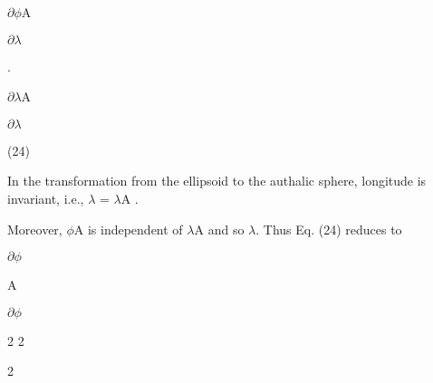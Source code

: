 \documentclass[a4paper,portrait,12pt]{article}
\begin{document}
\newpage



\begin{flushleft}
$\partial$$\phi$A 
\end{flushleft}


\newpage



\begin{flushleft}
$\partial$$\lambda$ \newpage
\newpage

\end{flushleft}


\newpage
 .


\begin{flushleft}
$\partial$$\lambda$A \newpage
\newpage

\end{flushleft}


\newpage



\begin{flushleft}
$\partial$$\lambda$
\end{flushleft}





(24)





\begin{flushleft}
In the transformation from the ellipsoid to the authalic sphere, longitude is invariant, i.e., $\lambda$ = $\lambda$A .
\end{flushleft}


\begin{flushleft}
Moreover, $\phi$A is independent of $\lambda$A and so $\lambda$. Thus Eq. (24) reduces to
\end{flushleft}


\begin{flushleft}
\newpage
 $\partial$$\phi$
\end{flushleft}


\begin{flushleft}
\newpage
 A
\end{flushleft}


\newpage



\begin{flushleft}
\newpage
 $\partial$$\phi$
\end{flushleft}


2 2


2
\end{document}
